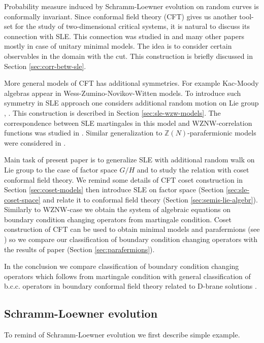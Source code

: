 \documentclass[12pt]{article}
\theoremstyle{definition}
\theoremstyle{definition} \newtheorem{Def}{Definition}
\begin{document}
Probability measure induced by Schramm-Loewner evolution on random curves is conformally invariant. Since conformal field theory (CFT) gives us another tool-set for the study of two-dimensional critical systems, it is natural to discuss its connection with SLE.  This connection  was studied in \cite{bauer2004conformal,bauer2004cfts,bauer2003sle,bauer2002sle} and many other papers mostly in case of unitary minimal models.
The idea is to consider certain observables in the domain with the cut. This construction is briefly discussed in Section \ref{sec:corr-betw-sle}. 

More general models of CFT has additional symmetries. For example Kac-Moody algebras  appear in Wess-Zumino-Novikov-Witten models. To introduce such symmetry in SLE approach one considers additional random motion on Lie group \cite{bettelheim2005stochastic}, \cite{Rasmussen:2004xr}. This construction is described in Section \ref{sec:sle-wzw-models}. The correspondence between SLE martingales in this model and WZNW-correlation functions was studied in \cite{alekseev2010sle}. Similar generalization to $\mathbb{Z}(N)$-parafermionic models were considered in \cite{santachiara2008sle,picco2008numerical}. 

Main task of present paper is to generalize SLE with additional random walk on Lie group to the case of factor space $G/H$ and to study the relation with coset conformal field theory. We remind some details of CFT coset construction in Section  \ref{sec:coset-models} then introduce SLE on factor space (Section \ref{sec:sle-coset-space} and relate it to conformal field theory (Section \ref{sec:semis-lie-algebr}). Similarly to WZNW-case we obtain the system of algebraic equations on boundary condition changing operators from martingale condition. 
Coset construction of CFT can be used to obtain minimal models and parafermions (see \cite{difrancesco1997cft}) so we compare our classification of boundary condition changing operators with the results of paper \cite{santachiara2008sle} (Section \ref{sec:parafermions}). 

In the conclusion we compare classification of boundary condition changing operators which follows from martingale condition with general classification of b.c.c. operators in boundary conformal field theory related to D-brane solutions \cite{fuchs2005geometry,fredenhagen2002d,elitzur2002d,Maldacena:2001ky,felder1999geometry,alekseev1999d}. 

\subsection{Schramm-Loewner evolution}
\label{sec:schr-loewn-evol}
To remind of Schramm-Loewner evolution we first describe simple example.
\end{document}
